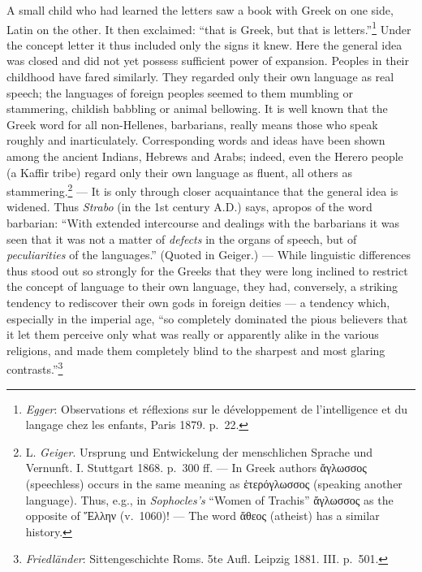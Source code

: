 \documentclass[12pt,a4paper]{book}
\newcommand{\opage}[1]{\marginnote{\footnotesize\textit{[#1]}}}
\begin{document}
A small child who had learned the letters saw a book with Greek on one
side, Latin on the other. It then exclaimed: ``that is
Greek, but that is letters.''\footnote{\emph{Egger}: Observations et
réflexions sur le développement de l'intelligence et du langage chez
les enfants, Paris 1879. p.~22.} Under the concept letter it thus
included only the signs it knew. Here the general idea was closed and
did not yet possess sufficient power of expansion. Peoples in their
childhood have fared similarly. They regarded only their own language as
real speech; the languages of foreign peoples seemed to them mumbling or
stammering, childish babbling or animal bellowing. It is well known that
the Greek word for all non-Hellenes, barbarians, really means those who
speak roughly and inarticulately. Corresponding words and ideas have been
shown among the ancient Indians, Hebrews and Arabs; indeed, even the
Herero people (a Kaffir tribe) regard only their own language as fluent,
all others as stammering.\footnote{L. \emph{Geiger}. Ursprung und
Entwickelung der menschlichen Sprache und Vernunft. I. Stuttgart 1868.
p.~300 ff. --- In Greek authors ἄγλωσσος (speechless) occurs in the same
meaning as ἑτερόγλωσσος (speaking another language). Thus, e.g., in
\emph{Sophocles's} ``Women of Trachis'' ἄγλωσσος as the opposite of
Ἕλλην (v.~1060)! --- The word ἄθεος (atheist) has a similar history.}
--- It is only through closer acquaintance that the general idea is
widened. Thus \emph{Strabo} (in the 1st century A.D.) says, apropos of
the word barbarian: ``With extended intercourse and dealings with the
barbarians it was seen that it was not a matter of \emph{defects} in the
organs of speech, but of \emph{peculiarities}
\opage{205}of the languages.'' (Quoted in Geiger.) --- While linguistic
differences thus stood out so strongly for the Greeks that they were
long inclined to restrict the concept of language to their own language,
they had, conversely, a striking tendency to rediscover their own gods
in foreign deities --- a tendency which, especially in the imperial age,
``so completely dominated the pious believers that it let them perceive
only what was really or apparently alike in the various religions, and
made them completely blind to the sharpest and most glaring
contrasts.''\footnote{\emph{Friedländer}: Sittengeschichte Roms. 5te
Aufl. Leipzig 1881. III. p.~501.}
\end{document}
